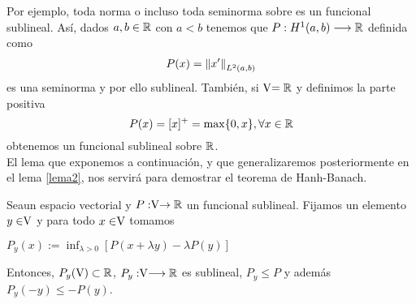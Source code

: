 Por ejemplo, toda norma o incluso toda seminorma sobre \vecSpace es un funcional sublineal. Así, dados $ a,b \in \mathbb{R} $ con $ a <b $ tenemos que $ P:H^{1} (a,b) \longrightarrow \mathbb{R}$ definida como \[ P(x) = \left\Vert x'\right\Vert_{L^2(a,b)} \] es una seminorma y por ello sublineal. También, si $ \vecSpace = \RR $ y definimos la parte positiva \[ P(x) = [x]^{+} = \max \{0,x\}, \forall x \in \mathbb{R} \] obtenemos un funcional sublineal sobre $\mathbb{R}$. \\
	
El lema que exponemos a continuación, y que generalizaremos posteriormente en el lema \ref{lema2}, nos servirá para demostrar el teorema de Hanh-Banach. 
	
\bigskip
	\begin{lemaBox}\label{lema1}
		Sea\vecSpace un espacio vectorial y $P:\vecSpace \rightarrow \RR$ un funcional sublineal. Fijamos un elemento $ y \in \vecSpace $ y para todo $ x \in \vecSpace $ tomamos  
		\begin{center}
			$ P_y(x) := \displaystyle\inf_{\lambda > 0} \left[P(x+\lambda y) - \lambda P(y)\right] $
		\end{center}
		
		Entonces, $ P_y(\vecSpace) \subset \RR$, $ P_y:\vecSpace \longrightarrow \RR $ es sublineal, $ P_y \leq P $ y además $ P_y (-y) \leq  -P(y)$.
	\end{lemaBox} 
